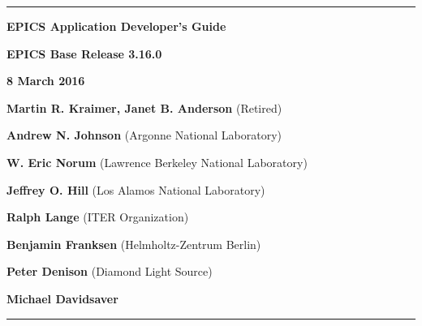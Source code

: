 \hrule

\vspace{1in}

\noindent \Huge \textbf{EPICS Application Developer's Guide}

\vspace{0.5in}

\noindent \Large \textbf{EPICS Base Release 3.16.0}

\noindent \textbf{8 March 2016}

\vspace{0.5in}

\normalsize
\noindent \textbf{Martin R. Kraimer, Janet B. Anderson} (Retired)

\noindent \textbf{Andrew N. Johnson} (Argonne National Laboratory)

\noindent \textbf{W. Eric Norum} (Lawrence Berkeley National Laboratory)

\noindent \textbf{Jeffrey O. Hill} (Los Alamos National Laboratory)

\noindent \textbf{Ralph Lange} (ITER Organization)

\noindent \textbf{Benjamin Franksen} (Helmholtz-Zentrum Berlin)

\noindent \textbf{Peter Denison} (Diamond Light Source)

\noindent \textbf{Michael Davidsaver}

\vspace{1in}
\hrule
